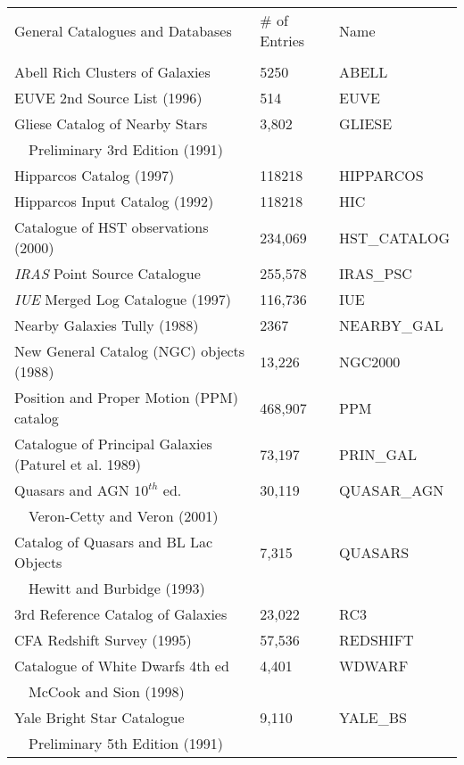 \begin{tabular}{lll}
 General Catalogues and Databases & \# of Entries & Name       \\
         &          &        \\

 Abell Rich Clusters of Galaxies & 5250 & ABELL  \\
 EUVE 2nd Source List (1996) & 514 & EUVE \\
 Gliese Catalog of Nearby Stars & 3,802 & GLIESE \\
 ~~Preliminary 3rd Edition (1991) & & \\
  Hipparcos Catalog (1997) & 118218 & HIPPARCOS \\
 Hipparcos Input Catalog (1992) & 118218 & HIC \\
 Catalogue of HST observations (2000) & 234,069 & HST\_CATALOG \\
 {\em IRAS} Point Source Catalogue & 255,578 & IRAS\_PSC \\
 {\em IUE} Merged Log Catalogue (1997) & 116,736 & IUE           \\ 
 Nearby Galaxies Tully (1988) & 2367 & NEARBY\_GAL  \\
 New General Catalog (NGC) objects (1988) & 13,226 & NGC2000 \\
 Position and Proper Motion (PPM) catalog & 468,907 & PPM \\
 Catalogue of Principal Galaxies (Paturel et al. 1989) & 73,197 & PRIN\_GAL \\
 Quasars and AGN $10^{th}$ ed. & 30,119 & QUASAR\_AGN \\
 ~~Veron-Cetty and Veron (2001) & & \\
 Catalog of Quasars and BL Lac Objects & 7,315 & QUASARS \\
 ~~Hewitt and Burbidge (1993) \\
 3rd Reference Catalog of Galaxies  & 23,022 & RC3 \\
  CFA Redshift Survey (1995) & 57,536 & REDSHIFT            \\
  Catalogue of White Dwarfs 4th ed   & 4,401 & WDWARF \\
 ~~McCook and Sion (1998) & & \\
 Yale Bright Star Catalogue & 9,110 & YALE\_BS        \\  
 ~~Preliminary 5th Edition (1991) & & \\

\end{tabular}
                                                      
                                        
